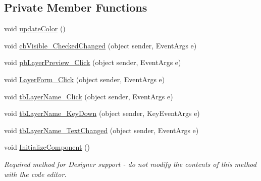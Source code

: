 \subsection*{Private Member Functions}
\begin{DoxyCompactItemize}
\item 
void \mbox{\hyperlink{class_paint___program_1_1_layer_item_a30d692ca1e4a7904c71901f42e615195}{update\+Color}} ()
\item 
void \mbox{\hyperlink{class_paint___program_1_1_layer_item_a28d83ed5185a05aef8881a747be998c5}{cb\+Visible\+\_\+\+Checked\+Changed}} (object sender, Event\+Args e)
\item 
void \mbox{\hyperlink{class_paint___program_1_1_layer_item_a0e322beb67184d03159c83c51a9d4f18}{pb\+Layer\+Preview\+\_\+\+Click}} (object sender, Event\+Args e)
\item 
void \mbox{\hyperlink{class_paint___program_1_1_layer_item_a1ebd3bed165ce47d5530ca2ea2231aa3}{Layer\+Form\+\_\+\+Click}} (object sender, Event\+Args e)
\item 
void \mbox{\hyperlink{class_paint___program_1_1_layer_item_adb9c7138bcc3b99d1e5a53d3c7a81158}{tb\+Layer\+Name\+\_\+\+Click}} (object sender, Event\+Args e)
\item 
void \mbox{\hyperlink{class_paint___program_1_1_layer_item_aac19726d3b27cc9f8d8555140f78a367}{tb\+Layer\+Name\+\_\+\+Key\+Down}} (object sender, Key\+Event\+Args e)
\item 
void \mbox{\hyperlink{class_paint___program_1_1_layer_item_ad2a0b5d51790855d5f254b0d0fa118e3}{tb\+Layer\+Name\+\_\+\+Text\+Changed}} (object sender, Event\+Args e)
\item 
void \mbox{\hyperlink{class_paint___program_1_1_layer_item_a15df54e7a31385d6eb90d78709187fee}{Initialize\+Component}} ()
\begin{DoxyCompactList}\small\item\em Required method for Designer support -\/ do not modify the contents of this method with the code editor. \end{DoxyCompactList}\end{DoxyCompactItemize}
